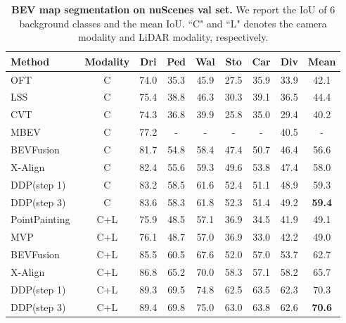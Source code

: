 \documentclass[10pt,twocolumn,letterpaper]{article}
\newcommand{\ours}[0]{DDP\xspace}
\begin{document}
\begin{table}[t]
    \centering
    \footnotesize
    \renewcommand\arraystretch{1.05}
    \setlength{\tabcolsep}{0.88mm}
    \begin{tabular}{l|c|cccccc|c}
Method & Modality & Dri & Ped & Wal & Sto & Car & Div & Mean \\
        \hline 
        OFT~\cite{roddick2018orthographic} & C & 74.0 & 35.3 & 45.9 & 27.5 & 35.9 & 33.9 & 42.1 \\
        LSS~\cite{philion2020lift}  & C & 75.4 & 38.8 & 46.3 & 30.3 & 39.1 & 36.5 & 44.4 \\
        CVT~\cite{zhou2022cross}  & C &  74.3 & 36.8 & 39.9 & 25.8 & 35.0 & 29.4 & 40.2 \\
        MBEV~\cite{xie2022m2bev} & C & 77.2 & - & - & - & - & 40.5 & - \\
        BEVFusion~\cite{liu2022bevfusion} & C & 81.7 & 54.8 & 58.4 & 47.4 & 50.7 & 46.4 & 56.6 \\
        X-Align~\cite{borse2023x} & C & 82.4 & 55.6 & 59.3 & 49.6 & 53.8 & 47.4 & 58.0 \\ 
        \rowcolor{gray!10} 
        \ours (step 1) & C &83.2  &58.5 &61.6 &52.4 &51.1 &48.9 &59.3 \\
        \rowcolor{gray!10} 
        \ours (step 3) & C & 83.6 &58.3 &61.8 &52.3 &51.4 &49.2 &\textbf{59.4} \\
        \hline 
        PointPainting~\cite{vora2020pointpainting}  & C+L & 75.9 & 48.5 & 57.1 & 36.9 & 34.5 & 41.9 & 49.1 \\
        MVP~\cite{yin2021multimodal} & C+L & 76.1 & 48.7 & 57.0 & 36.9 & 33.0 & 42.2 & 49.0 \\
        BEVFusion~\cite{liu2022bevfusion} & C+L & 85.5 & 60.5 & 67.6 & 52.0 & 57.0 & 53.7 & 62.7 \\
        X-Align~\cite{borse2023x} & C+L & 86.8 & 65.2 & 70.0 & 58.3 & 57.1 & 58.2 & 65.7 \\
        \rowcolor{gray!10} 
        \ours (step 1)  & C+L & 89.3   &69.5   &74.8  &62.5 &63.5   & 62.3    &70.3   \\
        \rowcolor{gray!10} 
        \ours (step 3)  & C+L &89.4   &69.8 &75.0   &63.0   & 63.8   &62.6   &\textbf{70.6} \\
    \end{tabular}
    \vspace{1em}
    \caption{\textbf{BEV map segmentation on nuScenes val set.} 
    We report the IoU of 6 background classes and the mean IoU.
    ``C" and ``L" denotes the camera modality and LiDAR modality, respectively.
    }
    \label{tab:exp:bev:nuscenes}
\end{table}
\end{document}
